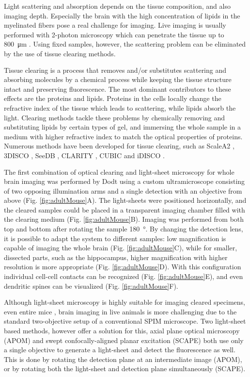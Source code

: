     Light scattering and absorption depends on the tissue composition, and also imaging depth. Especially the brain with the high concentration of lipids in the myelinated fibers pose a real challenge for imaging. Live imaging is usually performed with 2-photon microscopy which can penetrate the tissue up to \SI{800}{\micro m} \cite{katona_fast_2012}. Using fixed samples, however, the scattering problem can be eliminated by the use of tissue clearing methods.

    Tissue clearing is a process that removes and/or substitutes scattering and absorbing molecules by a chemical process while keeping the tissue structure intact and preserving fluorescence. The most dominant contributors to these effects are the proteins and lipids. Proteins in the cells locally change the refractive index of the tissue which leads to scattering, while lipids absorb the light. Clearing methods tackle these problems by chemically removing and substituting lipids by certain types of gel, and immersing the whole sample in a medium with higher refractive index to match the optical properties of proteins. Numerous methods have been developed for tissue clearing, such as ScaleA2 \cite{hama_scale:_2011}, 3DISCO \cite{erturk_three-dimensional_2012,erturk_three-dimensional_2012-1}, SeeDB \cite{ke_seedb:_2013}, CLARITY \cite{chung_clarity_2013}, CUBIC \cite{susaki_whole-brain_2014} and iDISCO \cite{renier_idisco:_2014}.

    The first combination of optical clearing and light-sheet microscopy for whole brain imaging was performed by Dodt \etal using a custom ultramicroscope consisting of two opposing illumination arms and a single detection with an objective from above (Fig. \ref{fig:adultMouse}A). The light-sheets were positioned horizontally, and the cleared samples could be placed in a transparent imaging chamber filled with the clearing medium (Fig. \ref{fig:adultMouse}B). Imaging was performed from both top and bottom after rotating the sample \SI{180}{\degree}. By changing the detection lens, it is possible to adapt the system to different samples: low magnification is capable of imaging the whole brain (Fig. \ref{fig:adultMouse}C), while for smaller, dissected parts, such as the hippocampus, higher magnification with higher resolution is more appropriate (Fig. \ref{fig:adultMouse}D). With this configuration individual cell-cell contacts can be recognized (Fig. \ref{fig:adultMouse}E), and even dendritic spines can be visualized (Fig. \ref{fig:adultMouse}F).

    Although light-sheet microscopy is highly suitable for imaging cleared specimens, even entire mice \cite{tainaka_whole-body_2014}, brain imaging in live animals is more challenging due to the standard two-objective setup of a conventional SPIM microscope. Two light-sheet based methods, however offer a solution for this, axial plane optical microscopy (APOM) \cite{li_axial_2014} and swept confocally-aligned planar excitation (SCAPE) \cite{bouchard_swept_2015} both use only a single objective to generate a light-sheet and detect the fluorescence as well. This is done by rotating the detection plane at an intermediate image (APOM), or by rotating both the light-sheet and detection plane simultaneously (SCAPE).


